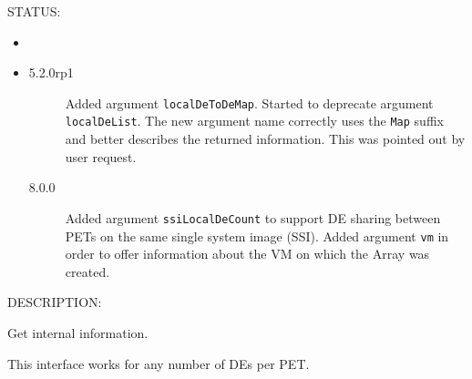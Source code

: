 {\sf STATUS:}
   \begin{itemize}
   \item{}
   \item{}
   \begin{description}
   \item[5.2.0rp1] Added argument {\tt localDeToDeMap}.
   Started to deprecate argument {\tt localDeList}.
   The new argument name correctly uses the {\tt Map} suffix and
   better describes the returned information.
   This was pointed out by user request.
   \item[8.0.0] Added argument {\tt ssiLocalDeCount} to support DE sharing
   between PETs on the same single system image (SSI).\newline
   Added argument {\tt vm} in order to offer information about the
   VM on which the Array was created.
   \end{description}
   \end{itemize}
  
{\sf DESCRIPTION:\\ }


   Get internal information.
  
   This interface works for any number of DEs per PET.
  
